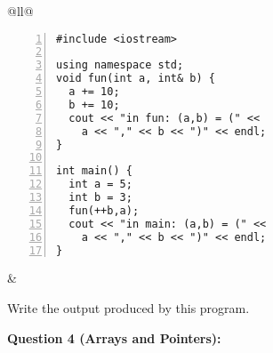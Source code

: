 \documentclass[11pt]{article}
\begin{document}
\begin{tabular}[t]{@{}ll@{}} 
\begin{minipage}[t]{0.48\columnwidth}
{\footnotesize
\begin{Verbatim}[frame=single,numbers=left]
#include <iostream>

using namespace std;
void fun(int a, int& b) {
  a += 10; 
  b += 10;
  cout << "in fun: (a,b) = (" << 
    a << "," << b << ")" << endl;  
}

int main() {
  int a = 5;
  int b = 3; 
  fun(++b,a);
  cout << "in main: (a,b) = (" <<
    a << "," << b << ")" << endl;
}
\end{Verbatim}
}
\end{minipage} &
\begin{minipage}[t]{0.5\columnwidth}

Write the output produced by this program. 

\end{minipage}
\end{tabular}



\vspace{20pt}
{\bf Question 4 (Arrays and Pointers):} 
\end{document}
